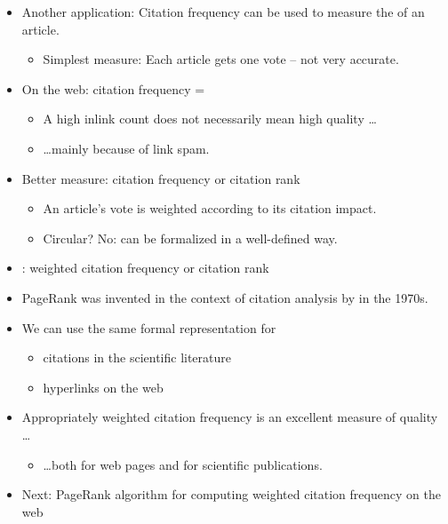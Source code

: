 \documentclass[a4paper,landscape,headrule,footrule,xetex]{foils}
\begin{document}

\begin{itemize}
\item Another application: Citation frequency can be used to measure
  the  of an article.
\begin{itemize}
\item Simplest measure: Each article gets one vote -- not
  very accurate.
\end{itemize}
\item On the web: citation frequency = 
\begin{itemize}
\item A high inlink count does not necessarily
  mean high quality \ldots
\item \ldots mainly because of link spam.
\end{itemize}
\item Better measure:  citation frequency or citation rank
\begin{itemize}
\item An article's vote is weighted according to its
  citation impact. 
\item Circular? No: can be formalized in a
  well-defined way.
\end{itemize}
\end{itemize}



\begin{itemize}
\item {}: weighted citation frequency or citation rank
\item PageRank was invented in the context of citation
  analysis by \citet{PINSKI1976297} in the 1970s.
\end{itemize}




\begin{itemize}
\item We can use the same formal representation for
\begin{itemize}
\item citations in the scientific literature
\item hyperlinks on the web
\end{itemize}
\item Appropriately weighted citation frequency is an
  excellent measure of  quality \ldots
\begin{itemize}
\item \ldots both for web pages and for scientific publications.
\end{itemize}
\item Next: PageRank algorithm for computing weighted
  citation frequency on the web
\end{itemize}
\end{document}
